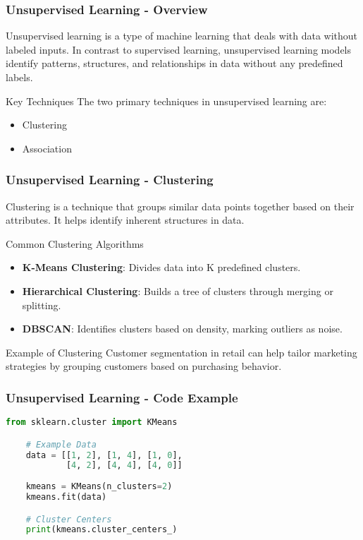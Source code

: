 \documentclass[aspectratio=169]{beamer}
\begin{document}
\begin{frame}[fragile]
    \frametitle{Unsupervised Learning - Overview}
    Unsupervised learning is a type of machine learning that deals with data without labeled inputs. 
    In contrast to supervised learning, unsupervised learning models identify patterns, structures, and relationships in data without any predefined labels.
    
    \begin{block}{Key Techniques}
        The two primary techniques in unsupervised learning are:
        \begin{itemize}
            \item Clustering
            \item Association
        \end{itemize}
    \end{block}
\end{frame}

\begin{frame}[fragile]
    \frametitle{Unsupervised Learning - Clustering}
    Clustering is a technique that groups similar data points together based on their attributes. It helps identify inherent structures in data.
    
    \begin{block}{Common Clustering Algorithms}
        \begin{itemize}
            \item \textbf{K-Means Clustering}: Divides data into K predefined clusters.
            \item \textbf{Hierarchical Clustering}: Builds a tree of clusters through merging or splitting.
            \item \textbf{DBSCAN}: Identifies clusters based on density, marking outliers as noise.
        \end{itemize}
    \end{block}

    \begin{block}{Example of Clustering}
        Customer segmentation in retail can help tailor marketing strategies by grouping customers based on purchasing behavior.
    \end{block}
\end{frame}

\begin{frame}[fragile]
    \frametitle{Unsupervised Learning - Code Example}
    \begin{lstlisting}[language=Python]
    from sklearn.cluster import KMeans

    # Example Data
    data = [[1, 2], [1, 4], [1, 0],
            [4, 2], [4, 4], [4, 0]]
            
    kmeans = KMeans(n_clusters=2)
    kmeans.fit(data)

    # Cluster Centers
    print(kmeans.cluster_centers_)
    \end{lstlisting}
\end{frame}
\end{document}
